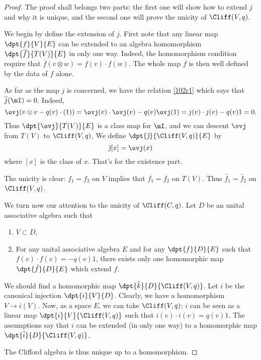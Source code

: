 \begin{proof}
The proof shall belongs two parts: the first one will show how to extend $j$ and why it is unique, and the second one will prove the unicity of $\Cliff(V,q)$.

We begin by define the extension of $j$. First note that any linear map $\dpt{f}{V}{E}$ can be extended to an algebra homomorphism $\dpt{\overline{f}}{T(V)}{E}$ in only one way. Indeed, the homomorphism condition require that $\overline{f}(v\otimes w)=f(v)\cdot f(w)$.  The whole map $\overline{f}$ is then well defined by the data of $f$ alone.

As far as the map $j$ is concerned, we have the relation \eqref{102r1} which says that $\overline{j}(\mI)=0$. Indeed,
\begin{equation}
 \ovj(v\otimes v-q(v)\cdot(1))=\ovj(v)\cdot\ovj(v)-q(v)\ovj(1)
                              =j(v)\cdot j(v)-q(v)1
                              =0.
\end{equation}
Thus $\dpt{\ovj}{T(V)}{E}$ is a class map for $\mI$, and we can descent $\ovj$ from $T(V)$ to $\Cliff(V,q)$, We define
$\dpt{\tilde\jmath}{\Cliff(V,q)}{E}$ by
\begin{equation}
         \tilde\jmath[x]=\ovj(x)
\end{equation}
where $[x]$ is the class of $x$. That's for the existence part.

The unicity is clear: $f_1=f_2$ on $V$ implies that $\overline{f_1}=\overline{f_2}$ on $T(V)$. Thus $\tilde{f_1}=\tilde{f_2}$ on $\Cliff(V,q)$.

We turn now our attention to the unicity of $\Cliff(C,q)$. Let $D$ be an unital associative algebra such that
\begin{enumerate}
\item $V\subset D$,
\item For any unital associative algebra $E$ and for any $\dpt{f}{D}{E}$ such that $f(v)\cdot f(v)=-q(v)1$, there exists only one homomorphic map $\dpt{\tilde{f}}{D}{E}$ which extend $f$.
\end{enumerate}
We should find a homomorphic map $\dpt{\tilde{k}}{D}{\Cliff(V,q)}$. Let $i$ be the canonical injection $\dpt{i}{V}{D}$. Clearly, we have a homomorphism $V\rightarrow i(V)$. Now, as a space $E$, we can take $\Cliff(V,q)$; $i$ can be seen as a linear map $\dpt{i}{V}{\Cliff(V,q)}$ such that $i(v)\cdot i(v)=q(v)1$. The assumptions say that $i$ can be extended (in only one way) to a homomorphic map $\dpt{\tilde{i}}{D}{\Cliff(V,q)}$.

The Clifford algebra is thus unique up to a homomorphism.

\end{proof}

